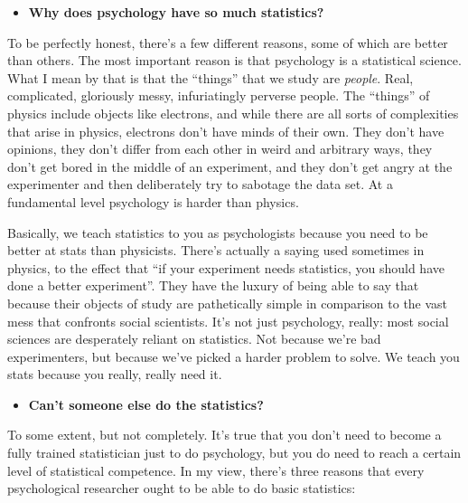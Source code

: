 \documentclass[
]{book}
\providecommand{\tightlist}{%
  \setlength{\itemsep}{0pt}\setlength{\parskip}{0pt}}
\begin{document}
\begin{itemize}
\tightlist
\item
  \textbf{Why does psychology have so much statistics?}
\end{itemize}

To be perfectly honest, there's a few different reasons, some of which are better than others. The most important reason is that psychology is a statistical science. What I mean by that is that the ``things'' that we study are \emph{people}. Real, complicated, gloriously messy, infuriatingly perverse people. The ``things'' of physics include objects like electrons, and while there are all sorts of complexities that arise in physics, electrons don't have minds of their own. They don't have opinions, they don't differ from each other in weird and arbitrary ways, they don't get bored in the middle of an experiment, and they don't get angry at the experimenter and then deliberately try to sabotage the data set. At a fundamental level psychology is harder than physics.

Basically, we teach statistics to you as psychologists because you need to be better at stats than physicists. There's actually a saying used sometimes in physics, to the effect that ``if your experiment needs statistics, you should have done a better experiment''. They have the luxury of being able to say that because their objects of study are pathetically simple in comparison to the vast mess that confronts social scientists. It's not just psychology, really: most social sciences are desperately reliant on statistics. Not because we're bad experimenters, but because we've picked a harder problem to solve. We teach you stats because you really, really need it.

\begin{itemize}
\tightlist
\item
  \textbf{Can't someone else do the statistics?}
\end{itemize}

To some extent, but not completely. It's true that you don't need to become a fully trained statistician just to do psychology, but you do need to reach a certain level of statistical competence. In my view, there's three reasons that every psychological researcher ought to be able to do basic statistics:
\end{document}
